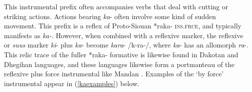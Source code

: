 \label{ParaByForce} 

This instrumental prefix often accompanies verbs that deal with cutting or striking actions. Actions bearing \textit{ka}- often involve some kind of sudden movement. This prefix is a reflex of Proto-Siouan *raka- \textsc{ins.frce}, and typically manifests as \textit{ka-}. However, when combined with a reflexive marker, the reflexive or \textit{suus} marker \textit{ki}- plus \textit{ka}- become \textit{kara}- /k-ra-/, where \textit{ka}- has an allomorph \textit{ra}-. This relic trace of the fuller *raka- formative is likewise found in Dakotan and Dhegihan languages, and these languages likewise form a portmanteau of the reflexive plus force instrumental like Mandan \citep{rankin2015}. Examples of the `by force' instrumental appear in (\ref{kaexamples}) below.

